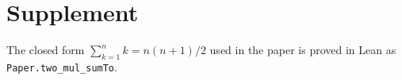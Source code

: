 \documentclass{article}
\begin{document}
\section*{Supplement}
The closed form $\sum_{k=1}^{n} k = n(n+1)/2$ used in the paper is proved in
Lean as \texttt{Paper.two\_mul\_sumTo}.
\end{document}
